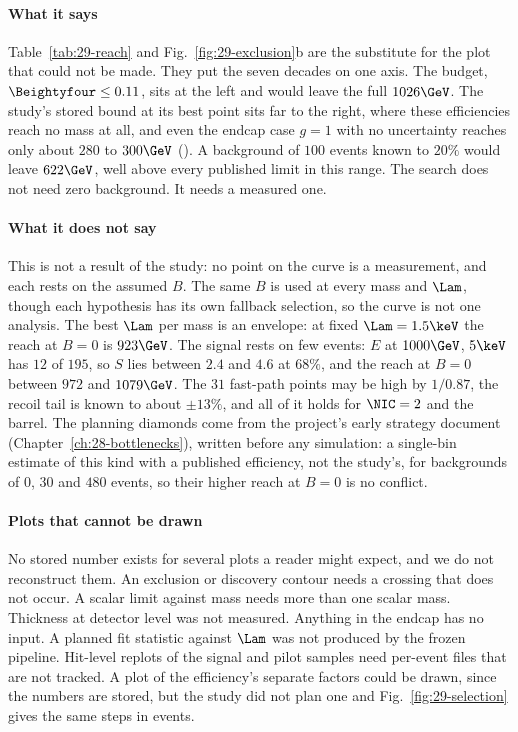 \paragraph{What it says}
Table~\ref{tab:29-reach} and Fig.~\ref{fig:29-exclusion}b are the substitute for the plot that could not be made. They put the seven decades on one axis. The budget, $\Beightyfour\le0.11$, sits at the left and would leave the full $1026\GeV$. The study's stored bound at its best point sits far to the right, where these efficiencies reach no mass at all, and even the endcap case $g=1$ with no uncertainty reaches only about $280$ to $300\GeV$ (\EST). A background of $100$ events known to $20\%$ would leave $622\GeV$, well above every published limit in this range. The search does not need zero background. It needs a measured one.

\paragraph{What it does not say}
This is not a result of the study: no point on the curve is a measurement, and each rests on the assumed $B$. The same $B$ is used at every mass and $\Lam$, though each hypothesis has its own fallback selection, so the curve is not one analysis. The best $\Lam$ per mass is an envelope: at fixed $\Lam=1.5\keV$ the reach at $B=0$ is $923\GeV$. The signal rests on few events: $E$ at $1000\GeV$, $5\keV$ has $12$ of $195$, so $S$ lies between $2.4$ and $4.6$ at $68\%$, and the reach at $B=0$ between $972$ and $1079\GeV$. The $31$ fast-path points may be high by $1/0.87$, the recoil tail is known to about $\pm13\%$, and all of it holds for $\NIC=2$ and the barrel. The planning diamonds come from the project's early strategy document (Chapter~\ref{ch:28-bottlenecks}), written before any simulation: a single-bin estimate of this kind with a published efficiency, not the study's, for backgrounds of $0$, $30$ and $480$ events, so their higher reach at $B=0$ is no conflict.

\paragraph{Plots that cannot be drawn}
No stored number exists for several plots a reader might expect, and we do not reconstruct them. An exclusion or discovery contour needs a crossing that does not occur. A scalar limit against mass needs more than one scalar mass. Thickness at detector level was not measured. Anything in the endcap has no input. A planned fit statistic against $\Lam$ was not produced by the frozen pipeline. Hit-level replots of the signal and pilot samples need per-event files that are not tracked. A plot of the efficiency's separate factors could be drawn, since the numbers are stored, but the study did not plan one and Fig.~\ref{fig:29-selection} gives the same steps in events.

